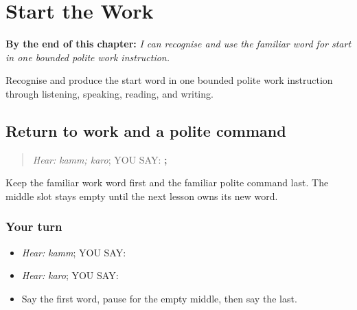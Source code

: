 
\chapter{Start the Work}
\label{ch:pa-a2-shuru}

\begin{chapteropening}
\textbf{By the end of this chapter:} \emph{I can recognise and use the familiar word for start in one bounded polite work instruction.}

Recognise and produce the start word in one bounded polite work instruction through listening, speaking, reading, and writing.
\end{chapteropening}

\section[\texorpdfstring{\pa{ਕੰਮ} · \pa{ਕਰੋ} (kamm; karo)}{ਕੰਮ · ਕਰੋ (kamm; karo)}]{Return to work and a polite command}

\label{lesson:PA-C196-work-command-return}



\begin{quote}
\emph{Hear:} \emph{kamm; karo}; YOU SAY: \textbf{; }
\end{quote}

\begin{grammarlens}[title={Grammar Lens}]
Keep the familiar work word first and the familiar polite command last. The middle slot stays empty until the next lesson owns its new word.
\end{grammarlens}

\subsection*{Your turn}
\begin{itemize}
\raggedright
  \item \emph{Hear:} \emph{kamm}; YOU SAY: \textbf{}
  \item \emph{Hear:} \emph{karo}; YOU SAY: \textbf{}
  \item Say the first word, pause for the empty middle, then say the last.
\end{itemize}

